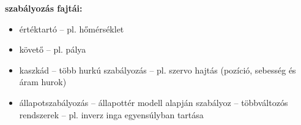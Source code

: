 \begin{minipage}[t]{0.48\textwidth}
    \textbf{szabályozás fajtái:}
    \begin{itemize}
        \item értéktartó – pl. hőmérséklet
        \item követő – pl. pálya
        \item kaszkád – több hurkú szabályozás – pl. szervo hajtás (pozíció, sebesség és áram hurok)
        \item állapotszabályozás – állapottér modell alapján szabályoz – többváltozós rendszerek – pl. inverz inga egyensúlyban tartása
    \end{itemize}
\end{minipage}
